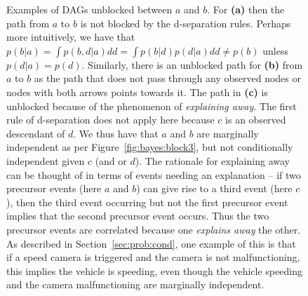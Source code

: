 \begin{figure}[t]
	\centering 
	\hspace{-15pt}
	\begin{subfigure}[t]{0.32\textwidth}
		\centering
		\resizebox{0.9\textwidth}{!}{
		}
		\caption{\label{fig:bayes:unblock1}}
	\end{subfigure}
	\begin{subfigure}[t]{0.32\textwidth}
		\centering
		\resizebox{0.9\textwidth}{!}{
		}
		\caption{\label{fig:bayes:unblock2}}
	\end{subfigure}
	\begin{subfigure}[t]{0.32\textwidth}
		\centering
		\resizebox{1.1\textwidth}{!}{
		}
		\caption{\label{fig:bayes:unblock3}}
	\end{subfigure}
	\caption{Examples of DAGs unblocked between $a$ and $b$. For \textbf{(a)} then the path from $a$ to
		$b$ is not blocked by the d-separation rules.  Perhaps more intuitively, we have that
		$p(b|a) = \int p(b,d|a) dd = \int p(b|d)p(d|a) dd \neq p(b)$ unless $p(d|a)=p(d)$.
		Similarly, there is an unblocked path for \textbf{(b)} from $a$ to $b$ as the path
		that does not pass through any observed nodes or nodes with both arrows points towards it.
		The path in \textbf{(c)} is unblocked because of the phenomenon of \emph{explaining away}.
		The first rule of d-separation does not apply here because $c$ is an observed descendant of
		$d$.  We thus have that $a$ and $b$ are marginally independent as per Figure~\ref{fig:bayes:block3},
		but not conditionally independent given $c$ (and or $d$). The rationale for explaining away can be thought
		of in terms of events needing an explanation -- if two precursor events (here $a$ and $b$) can give rise 
		to a third event (here $c$), then
		the third event occurring but not the first precursor event implies that the second precursor
		event occurs.  Thus the two precursor events are correlated because one \emph{explains away} the other.
		As described in Section~\ref{sec:prob:cond}, one example of this is that if a speed camera is
		triggered and the camera is not malfunctioning, this implies the vehicle is speeding, even though
		the vehicle speeding and the camera malfunctioning are marginally independent.	
		\label{fig:bayes:unblocked-graphs}}
\end{figure}


